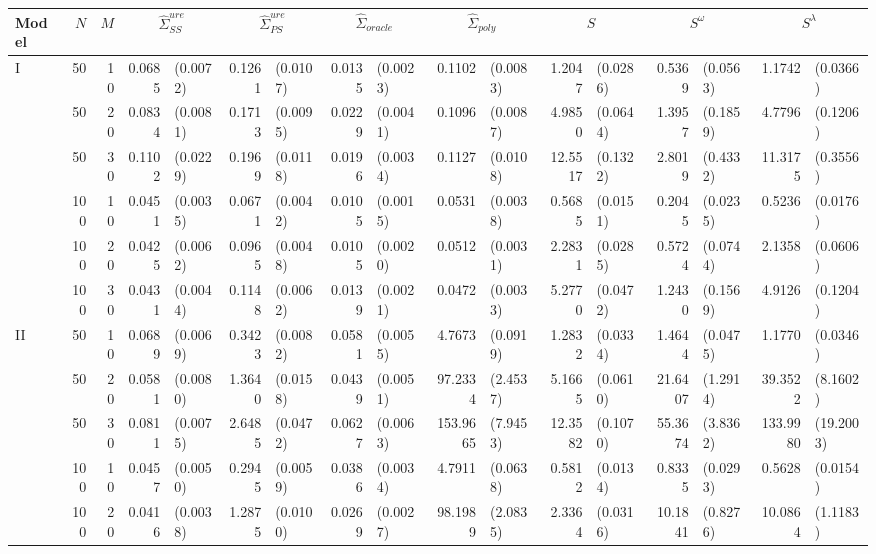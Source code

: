 \begin{landscape}
\begin{table}[H]
\begin{scriptsize}
\label{table:master-entropy-risk-table}
\begin{tabular}{lrrrlrlrlrlrlrlrl}
   Model & $N$ & $M$ & \multicolumn{2}{c}{$\hat{\Sigma}^{ure}_{SS}$} & \multicolumn{2}{c}{$\hat{\Sigma}^{ure}_{PS}$} & \multicolumn{2}{c}{$\hat{\Sigma}_{oracle}$} & \multicolumn{2}{c}{$\hat{\Sigma}_{poly}$} & \multicolumn{2}{c}{$S$} & \multicolumn{2}{c}{$S^\omega$} & \multicolumn{2}{c}{$S^\lambda$}\\ \hline
I & 50 & 10 & 0.0685 & (0.0072) & 0.1261 & (0.0107) & 0.0135 & (0.0023) & 0.1102 & (0.0083) & 1.2047 & (0.0286) & 0.5369 & (0.0563) & 1.1742 & (0.0366) \\ 
    & 50 & 20 & 0.0834 & (0.0081) & 0.1713 & (0.0095) & 0.0229 & (0.0041) & 0.1096 & (0.0087) & 4.9850 & (0.0644) & 1.3957 & (0.1859) & 4.7796 & (0.1206) \\ 
    & 50 & 30 & 0.1102 & (0.0229) & 0.1969 & (0.0118) & 0.0196 & (0.0034) & 0.1127 & (0.0108) & 12.5517 & (0.1322) & 2.8019 & (0.4332) & 11.3175 & (0.3556) \\ 
    & 100 & 10 & 0.0451 & (0.0035) & 0.0671 & (0.0042) & 0.0105 & (0.0015) & 0.0531 & (0.0038) & 0.5685 & (0.0151) & 0.2045 & (0.0235) & 0.5236 & (0.0176) \\ 
    & 100 & 20 & 0.0425 & (0.0062) & 0.0965 & (0.0048) & 0.0105 & (0.0020) & 0.0512 & (0.0031) & 2.2831 & (0.0285) & 0.5724 & (0.0744) & 2.1358 & (0.0606) \\ 
    & 100 & 30 & 0.0431 & (0.0044) & 0.1148 & (0.0062) & 0.0139 & (0.0021) & 0.0472 & (0.0033) & 5.2770 & (0.0472) & 1.2430 & (0.1569) & 4.9126 & (0.1204) \\ 
   \hline
II & 50 & 10 & 0.0689 & (0.0069) & 0.3423 & (0.0082) & 0.0581 & (0.0055) & 4.7673 & (0.0919) & 1.2832 & (0.0334) & 1.4644 & (0.0475) & 1.1770 & (0.0346) \\ 
    & 50 & 20 & 0.0581 & (0.0080) & 1.3640 & (0.0158) & 0.0439 & (0.0051) & 97.2334 & (2.4537) & 5.1665 & (0.0610) & 21.6407 & (1.2914) & 39.3522 & (8.1602) \\ 
    & 50 & 30 & 0.0811 & (0.0075) & 2.6485 & (0.0472) & 0.0627 & (0.0063) & 153.9665 & (7.9453) & 12.3582 & (0.1070) & 55.3674 & (3.8362) & 133.9980 & (19.2003) \\ 
    & 100 & 10 & 0.0457 & (0.0050) & 0.2945 & (0.0059) & 0.0386 & (0.0034) & 4.7911 & (0.0638) & 0.5812 & (0.0134) & 0.8335 & (0.0293) & 0.5628 & (0.0154) \\ 
    & 100 & 20 & 0.0416 & (0.0038) & 1.2875 & (0.0100) & 0.0269 & (0.0027) & 98.1989 & (2.0835) & 2.3364 & (0.0316) & 10.1841 & (0.8276) & 10.0864 & (1.1183) \\ 

\end{tabular}
\end{scriptsize}
\end{table}
\end{landscape}
